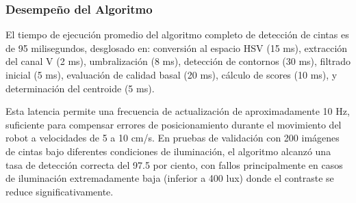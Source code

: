 \subsubsection{Desempeño del Algoritmo}

El tiempo de ejecución promedio del algoritmo completo de detección de cintas es de 95 milisegundos, desglosado en: conversión al espacio HSV (15 ms), extracción del canal V (2 ms), umbralización (8 ms), detección de contornos (30 ms), filtrado inicial (5 ms), evaluación de calidad basal (20 ms), cálculo de scores (10 ms), y determinación del centroide (5 ms).

Esta latencia permite una frecuencia de actualización de aproximadamente 10 Hz, suficiente para compensar errores de posicionamiento durante el movimiento del robot a velocidades de 5 a 10 cm/s. En pruebas de validación con 200 imágenes de cintas bajo diferentes condiciones de iluminación, el algoritmo alcanzó una tasa de detección correcta del 97.5 por ciento, con fallos principalmente en casos de iluminación extremadamente baja (inferior a 400 lux) donde el contraste se reduce significativamente.